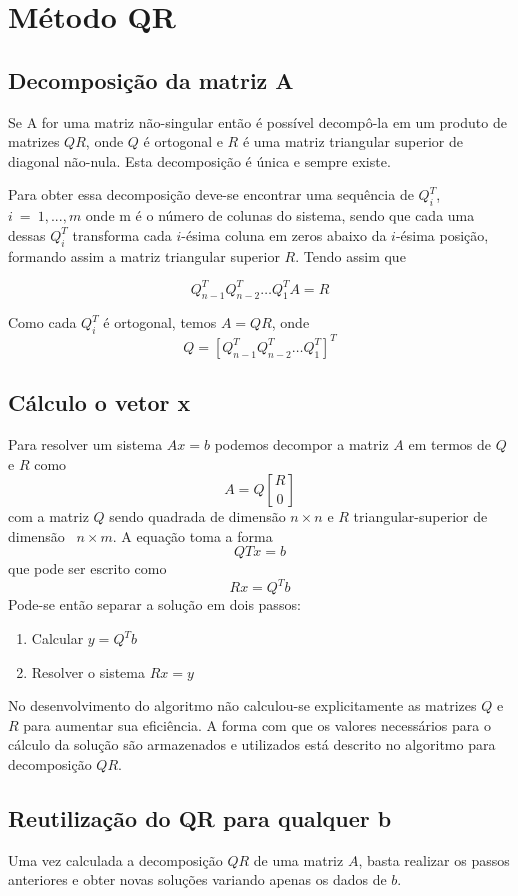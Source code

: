 \chapter{Método QR}

	\section{Decomposição da matriz A}
	Se A for uma matriz não-singular então é possível decompô-la em um produto de matrizes 
	$QR$, onde $Q$ é ortogonal e $R$ é uma matriz triangular superior de diagonal não-nula. Esta decomposição é única e sempre existe.
	
	Para obter essa decomposição deve-se encontrar uma sequência de $Q_i ^T$, $i~ =~ 1,...,m$ onde m é o número de colunas do sistema, sendo que cada uma dessas $Q_i^T$ transforma cada $i$-ésima coluna em zeros abaixo da $i$-ésima posição, formando assim a matriz triangular superior $R$.\cite{sawp} Tendo assim que
	
	\[Q_{n-1} ^TQ_{n-2} ^T \ldots Q_{1} ^T A = R\]
	
	Como cada $Q_i ^T$ é ortogonal, temos $A = QR$, onde \[Q = [Q_{n-1} ^T Q_{n-2} ^T \ldots Q_{1} ^T]^T \]
	\section{Cálculo o vetor x}
	Para resolver um sistema $Ax=b$ podemos decompor a matriz $A$ em termos de $Q$ e $R$ como \[ A = Q{R \brack 0}\] com a matriz $Q$ sendo quadrada de dimensão $n\times n$ e $R$ triangular-superior de dimensão~ $n\times m$.
	A equação toma a forma \[QTx = b\] que pode ser escrito como \[Rx=Q^Tb\]
	Pode-se então separar a solução em dois passos:
	\begin{enumerate}
	\item Calcular $y = Q^Tb$
	\item Resolver o sistema $Rx = y$
	\end{enumerate}
	
	No desenvolvimento do algoritmo não calculou-se explicitamente as matrizes $Q$ e $R$ para aumentar sua eficiência. A forma com que os valores necessários para o cálculo da solução são armazenados e utilizados está descrito no algoritmo para decomposição $QR$.
	
	\section{Reutilização do QR para qualquer b}
	Uma vez calculada a decomposição $QR$ de uma matriz $A$, basta realizar os passos anteriores e obter novas soluções variando apenas os dados de $b$.

